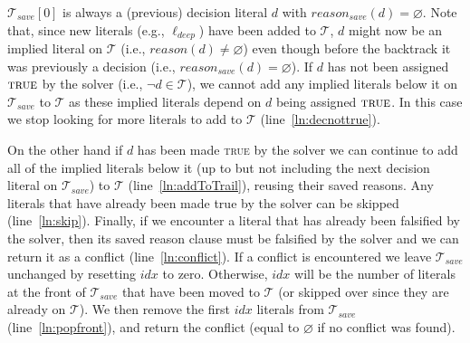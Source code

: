 \documentclass[runningheads]{llncs}
\newcommand{\trail}{\ensuremath{\mathcal{T}}}
\newcommand{\true}{\textsc{true}\xspace}
\newcommand{\reason}[1]{\ensuremath{\mathit{reason}(#1)}}
\newcommand{\reasonsave}[1]{\ensuremath{\mathit{reason_{\mathit{save}}(#1)}}}
\newcommand{\deepestLit}{\ell_{\textit{deep}}}
\newcommand{\trailsave}{\trail_{\mathit{save}}}
\begin{document}
$\trailsave[0]$ is always a (previous) decision literal $d$ with
$\reasonsave{d}=\varnothing$. Note that, since new literals (e.g.,
$\deepestLit$) have been added to $\trail$, $d$ might now be an
implied literal on $\trail$ (i.e., $\reason{d}\neq\varnothing$) even
though before the backtrack it was previously a decision (i.e.,
$\reasonsave{d}=\varnothing$). If $d$ has not been assigned $\true$ by
the solver (i.e., $\lnot d \in \trail$), we cannot add any implied
literals below it on $\trailsave$ to $\trail$ as these implied
literals depend on $d$ being assigned $\true$. In this case we stop
looking for more literals to add to $\trail$
(line~\ref{ln:decnottrue}).

On the other hand if $d$ has been made \true by the solver we can
continue to add all of the implied literals below it (up to but not
including the next decision literal on $\trailsave$) to $\trail$
(line~\ref{ln:addToTrail}), reusing their saved reasons. Any literals
that have already been made true by the solver can be skipped
(line~\ref{ln:skip}). Finally, if we encounter a literal that has
already been falsified by the solver, then its saved reason clause
must be falsified by the solver and we can return it as a conflict
(line~\ref{ln:conflict}). If a conflict is encountered we leave
$\trailsave$ unchanged by resetting $idx$ to zero. Otherwise, $idx$
will be the number of literals at the front of $\trailsave$ that have
been moved to $\trail$ (or skipped over since they are already on
$\trail$). We then remove the first $idx$ literals from $\trailsave$
(line~\ref{ln:popfront}), and return the conflict (equal to
$\varnothing$ if no conflict was found).
\end{document}
